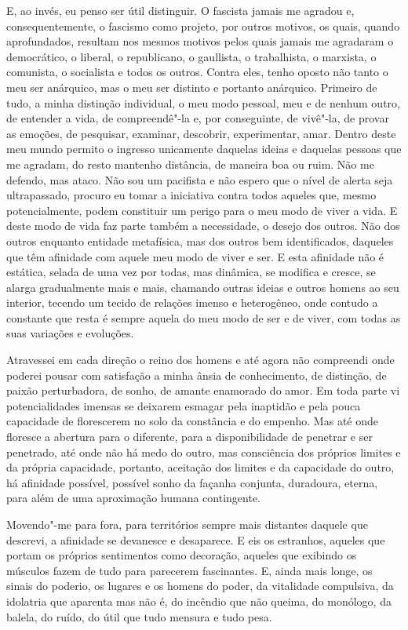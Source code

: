 E, ao invés, eu penso ser útil distinguir. O fascista jamais me agradou
e, consequentemente, o fascismo como projeto, por outros motivos, os
quais, quando aprofundados, resultam nos mesmos motivos pelos quais
jamais me agradaram o democrático, o liberal, o republicano, o
gaullista, o trabalhista, o marxista, o comunista, o socialista e todos
os outros. Contra eles, tenho oposto não tanto o meu ser anárquico, mas
o meu ser distinto e portanto anárquico. Primeiro de tudo, a minha
distinção individual, o meu modo pessoal, meu e de nenhum outro, de
entender a vida, de compreendê"-la e, por conseguinte, de vivê"-la, de
provar as emoções, de pesquisar, examinar, descobrir, experimentar,
amar. Dentro deste meu mundo permito o ingresso unicamente daquelas
ideias e daquelas pessoas que me agradam, do resto mantenho distância,
de maneira boa ou ruim. Não me defendo, mas ataco. Não sou um pacifista
e não espero que o nível de alerta seja ultrapassado, procuro eu tomar a
iniciativa contra todos aqueles que, mesmo potencialmente, podem
constituir um perigo para o meu modo de viver a vida. E deste modo de
vida faz parte também a necessidade, o desejo dos outros. Não dos outros
enquanto entidade metafísica, mas dos outros bem identificados, daqueles
que têm afinidade com aquele meu modo de viver e ser. E esta afinidade
não é estática, selada de uma vez por todas, mas dinâmica, se modifica e
cresce, se alarga gradualmente mais e mais, chamando outras ideias e
outros homens ao seu interior, tecendo um tecido de relações imenso e
heterogêneo, onde contudo a constante que resta é sempre aquela do meu
modo de ser e de viver, com todas as suas variações e evoluções.

Atravessei em cada direção o reino dos homens e até agora não compreendi
onde poderei pousar com satisfação a minha ânsia de conhecimento, de
distinção, de paixão perturbadora, de sonho, de amante enamorado do
amor. Em toda parte vi potencialidades imensas se deixarem esmagar pela
inaptidão e pela pouca capacidade de florescerem no solo da constância e
do empenho. Mas até onde floresce a abertura para o diferente, para a
disponibilidade de penetrar e ser penetrado, até onde não há medo do
outro, mas consciência dos próprios limites e da própria capacidade,
portanto, aceitação dos limites e da capacidade do outro, há afinidade
possível, possível sonho da façanha conjunta, duradoura, eterna, para
além de uma aproximação humana contingente.

Movendo"-me para fora, para territórios sempre mais distantes daquele que
descrevi, a afinidade se devanesce e desaparece. E eis os estranhos,
aqueles que portam os próprios sentimentos como decoração, aqueles que
exibindo os músculos fazem de tudo para parecerem fascinantes. E, ainda
mais longe, os sinais do poderio, os lugares e os homens do poder, da
vitalidade compulsiva, da idolatria que aparenta mas não é, do incêndio
que não queima, do monólogo, da balela, do ruído, do útil que tudo
mensura e tudo pesa.

